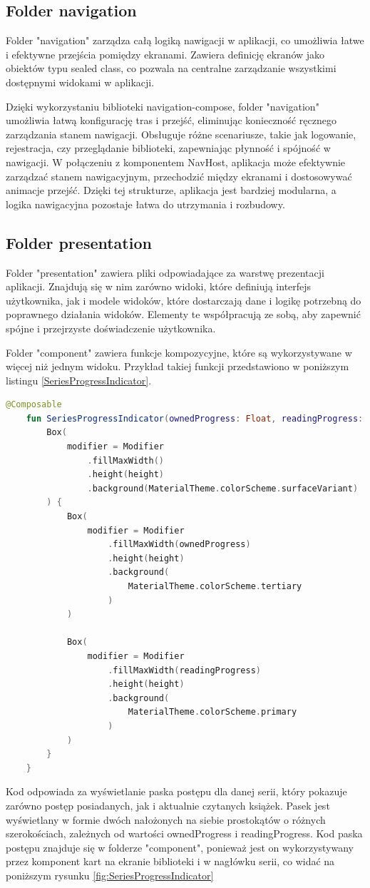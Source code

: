 \documentclass[12pt,twoside]{article}
\begin{document}
\subsection{Folder navigation}

Folder "navigation" zarządza całą logiką nawigacji w aplikacji, co umożliwia łatwe i efektywne przejścia pomiędzy 
ekranami. Zawiera definicję ekranów jako obiektów typu sealed class, co pozwala na centralne zarządzanie wszystkimi 
dostępnymi widokami w aplikacji.

Dzięki wykorzystaniu biblioteki navigation-compose, folder "navigation" umożliwia łatwą konfigurację tras i przejść, 
eliminując konieczność ręcznego zarządzania stanem nawigacji. Obsługuje różne scenariusze, takie jak logowanie, 
rejestracja, czy przeglądanie biblioteki, zapewniając płynność i spójność w nawigacji. 
W połączeniu z komponentem NavHost, aplikacja może efektywnie zarządzać stanem nawigacyjnym, przechodzić między 
ekranami i dostosowywać animacje przejść. Dzięki tej strukturze, aplikacja jest bardziej modularna, a logika 
nawigacyjna pozostaje łatwa do utrzymania i rozbudowy.

\subsection{Folder presentation}

Folder "presentation" zawiera pliki odpowiadające za warstwę prezentacji aplikacji. Znajdują się w nim zarówno widoki, 
które definiują interfejs użytkownika, jak i modele widoków, które dostarczają dane i logikę potrzebną do poprawnego 
działania widoków. Elementy te współpracują ze sobą, aby zapewnić spójne i przejrzyste doświadczenie użytkownika.

Folder "component" zawiera funkcje kompozycyjne, które są wykorzystywane w więcej niż jednym widoku. Przykład takiej 
funkcji przedstawiono w poniższym listingu \ref{SeriesProgressIndicator}.

\begin{lstlisting}[language=Kotlin,caption=kod funkcji SeriesProgressIndicator, label={SeriesProgressIndicator}]
	@Composable
	fun SeriesProgressIndicator(ownedProgress: Float, readingProgress: Float, height: Dp) {
		Box(
			modifier = Modifier
				.fillMaxWidth()
				.height(height)
				.background(MaterialTheme.colorScheme.surfaceVariant)
		) {
			Box(
				modifier = Modifier
					.fillMaxWidth(ownedProgress)
					.height(height)
					.background(
						MaterialTheme.colorScheme.tertiary
					)
			)
	
			Box(
				modifier = Modifier
					.fillMaxWidth(readingProgress)
					.height(height)
					.background(
						MaterialTheme.colorScheme.primary
					)
			)
		}
	}
\end{lstlisting}
Kod odpowiada za wyświetlanie paska postępu dla danej serii, który pokazuje zarówno postęp posiadanych, jak i 
aktualnie czytanych książek. Pasek jest wyświetlany w formie dwóch nałożonych na siebie prostokątów o różnych 
szerokościach, zależnych od wartości ownedProgress i readingProgress. Kod paska postępu znajduje się w folderze
"component", ponieważ jest on wykorzystywany przez komponent kart na ekranie biblioteki i w nagłówku serii, co widać
na poniższym rysunku \ref{fig:SeriesProgressIndicator}
\end{document}
